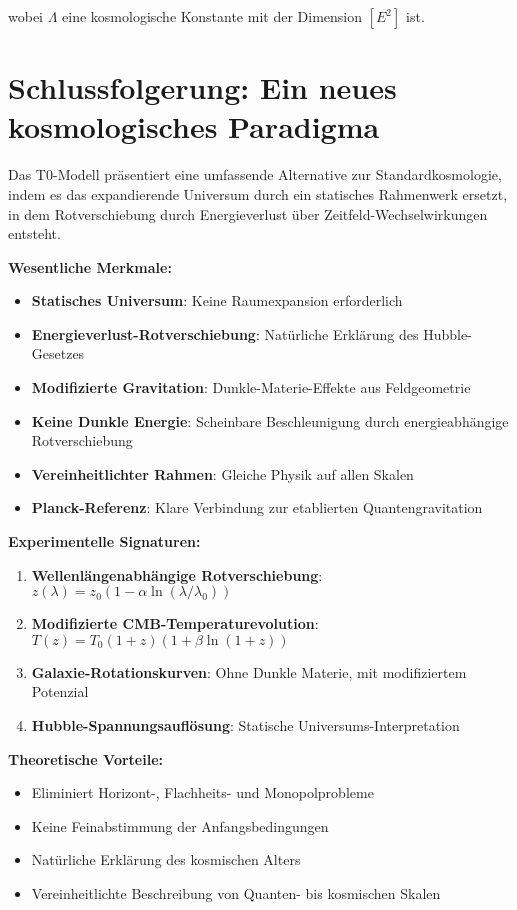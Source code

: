 \documentclass[12pt,a4paper]{report}
\begin{document}
wobei $\Lambda$ eine kosmologische Konstante mit der Dimension $[E^2]$ ist.
	\section{Schlussfolgerung: Ein neues kosmologisches Paradigma}
	\label{sec:conclusion_cosmology}
	
	Das T0-Modell präsentiert eine umfassende Alternative zur Standardkosmologie, indem es das expandierende Universum durch ein statisches Rahmenwerk ersetzt, in dem Rotverschiebung durch Energieverlust über Zeitfeld-Wechselwirkungen entsteht.
	
	\textbf{Wesentliche Merkmale:}
	\begin{itemize}
		\item \textbf{Statisches Universum}: Keine Raumexpansion erforderlich
		\item \textbf{Energieverlust-Rotverschiebung}: Natürliche Erklärung des Hubble-Gesetzes
		\item \textbf{Modifizierte Gravitation}: Dunkle-Materie-Effekte aus Feldgeometrie
		\item \textbf{Keine Dunkle Energie}: Scheinbare Beschleunigung durch energieabhängige Rotverschiebung
		\item \textbf{Vereinheitlichter Rahmen}: Gleiche Physik auf allen Skalen
		\item \textbf{Planck-Referenz}: Klare Verbindung zur etablierten Quantengravitation
	\end{itemize}
	
	\textbf{Experimentelle Signaturen:}
	\begin{enumerate}
		\item \textbf{Wellenlängenabhängige Rotverschiebung}: $z(\lambda) = z_0(1 - \alpha \ln(\lambda/\lambda_0))$
		\item \textbf{Modifizierte CMB-Temperaturevolution}: $T(z) = T_0(1+z)(1 + \beta \ln(1+z))$
		\item \textbf{Galaxie-Rotationskurven}: Ohne Dunkle Materie, mit modifiziertem Potenzial
		\item \textbf{Hubble-Spannungsauflösung}: Statische Universums-Interpretation
	\end{enumerate}
	
	\textbf{Theoretische Vorteile:}
	\begin{itemize}
		\item Eliminiert Horizont-, Flachheits- und Monopolprobleme
		\item Keine Feinabstimmung der Anfangsbedingungen
		\item Natürliche Erklärung des kosmischen Alters
		\item Vereinheitlichte Beschreibung von Quanten- bis kosmischen Skalen
	\end{itemize}
	
\end{document}
